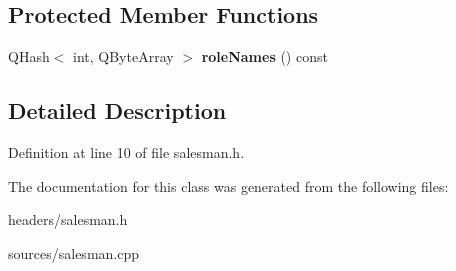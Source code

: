\subsection*{Protected Member Functions}
\begin{DoxyCompactItemize}
\item 
\mbox{\label{class_sales_model_ae483317481b0f4c68025e10dbd69e4ef}} 
Q\+Hash$<$ int, Q\+Byte\+Array $>$ {\bfseries role\+Names} () const
\end{DoxyCompactItemize}


\subsection{Detailed Description}


Definition at line 10 of file salesman.\+h.



The documentation for this class was generated from the following files\+:\begin{DoxyCompactItemize}
\item 
headers/salesman.\+h\item 
sources/salesman.\+cpp\end{DoxyCompactItemize}
